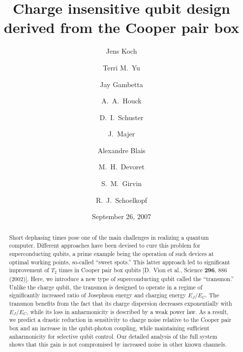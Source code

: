 \documentclass[twocolumn,amsmath,amssymb,floatfix,pra,showpacs,eqsecnum,footinbib,superscriptaddress]{revtex4}
\begin{document}
\title{Charge insensitive qubit design derived from the Cooper pair box}
\author{Jens Koch} 
\author{Terri M.\ Yu}
\author{Jay Gambetta}
\author{A.\ A.\ Houck}
\author{D.\ I.\ Schuster}
\author{J.\ Majer}
\author{Alexandre Blais}
\author{M.\ H.\ Devoret}
\author{S.\ M.\ Girvin}
\author{R.\ J.\ Schoelkopf}
\date{September 26, 2007}
\begin{abstract}
Short dephasing times pose one of the main challenges in realizing a quantum computer. Different approaches have been devised to cure this problem for superconducting qubits, a prime example being the operation of such devices at optimal working points, so-called ``sweet spots.'' This latter approach led to significant improvement of $T_2$ times in Cooper pair box qubits [D.\ Vion et al., Science \textbf{296}, 886 (2002)]. Here, we introduce a new type of superconducting qubit called the ``transmon.'' Unlike the charge qubit, the transmon is designed to operate in a regime of significantly increased ratio of Josephson energy and charging energy $E_J/E_C$.  The transmon benefits from the fact that its charge dispersion decreases exponentially with $E_J/E_C$, while its loss in anharmonicity is described by a weak power law. As a result, we predict a drastic reduction in sensitivity to charge noise relative to the Cooper pair box and an increase in the qubit-photon coupling, while maintaining sufficient anharmonicity for selective qubit control. Our detailed analysis of the full system shows that this gain is not compromised by increased noise in other known channels.
\end{abstract}
\maketitle
\end{document}
